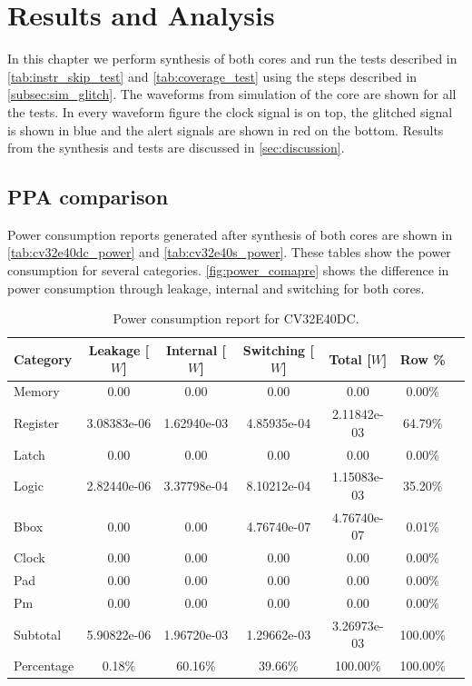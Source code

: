 \chapter{Results and Analysis}
\label{chap5}

In this chapter we perform synthesis of both cores and run the tests described in \autoref{tab:instr_skip_test} and \autoref{tab:coverage_test} using the steps described in \autoref{subsec:sim_glitch}. The waveforms from simulation of the core are shown for all the tests. In every waveform figure the clock signal is on top, the glitched signal is shown in blue and the alert signals are shown in red on the bottom. Results from the synthesis and tests are discussed in \autoref{sec:discussion}.

\section{PPA comparison}
\label{sec:synth_comparison}

Power consumption reports generated after synthesis of both cores are shown in \autoref{tab:cv32e40dc_power} and \autoref{tab:cv32e40s_power}. These tables show the power consumption for several categories. \autoref{fig:power_comapre} shows the difference in power consumption through leakage, internal and switching for both cores. 

\begin{table}[h]
\centering
\caption{Power consumption report for CV32E40DC.}
\label{tab:cv32e40dc_power}
\begin{tabular}{l|cccccc}
\toprule
Category & Leakage [$W$] & Internal [$W$] & Switching [$W$] & Total [$W$] & Row \% \\
\midrule
\rowcolor{black!20} Memory & 0.00 & 0.00 & 0.00 & 0.00 & 0.00\% \\
Register & 3.08383e-06 & 1.62940e-03 & 4.85935e-04 & 2.11842e-03 & 64.79\% \\
\rowcolor{black!20}Latch & 0.00 & 0.00 & 0.00 & 0.00 & 0.00\% \\
Logic & 2.82440e-06 & 3.37798e-04 & 8.10212e-04 & 1.15083e-03 & 35.20\% \\
\rowcolor{black!20}Bbox & 0.00 & 0.00 & 4.76740e-07 & 4.76740e-07 & 0.01\% \\
Clock & 0.00 & 0.00 & 0.00 & 0.00 & 0.00\% \\
\rowcolor{black!20}Pad & 0.00 & 0.00 & 0.00 & 0.00 & 0.00\% \\
Pm & 0.00 & 0.00 & 0.00 & 0.00 & 0.00\% \\
\midrule
\rowcolor{black!20} Subtotal & 5.90822e-06 & 1.96720e-03 & 1.29662e-03 & 3.26973e-03 & 100.00\% \\
Percentage & 0.18\% & 60.16\% & 39.66\% & 100.00\% & 100.00\% \\
\bottomrule
\end{tabular}
\end{table}

